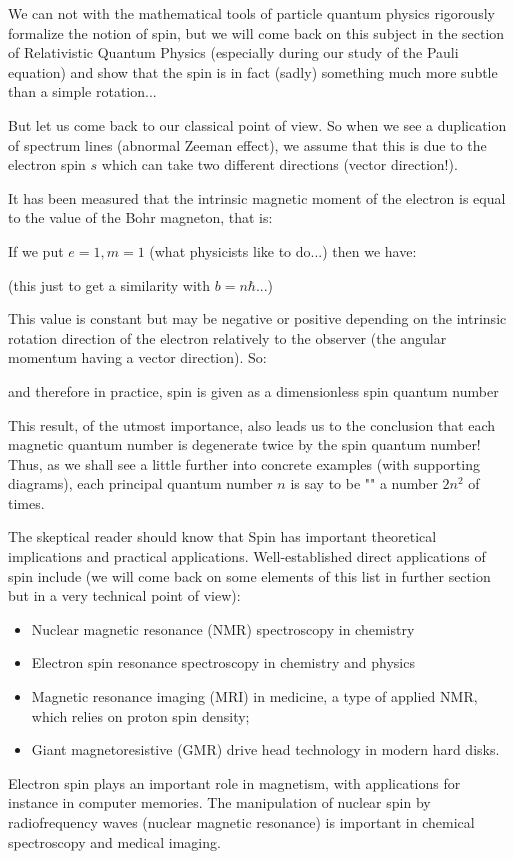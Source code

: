    We can not with the mathematical tools of particle quantum physics rigorously formalize the notion of spin, but we will come back on this subject in the section of  Relativistic Quantum Physics (especially during our study of the Pauli equation) and show that the spin is in fact (sadly) something much more subtle than a simple rotation...

    But let us come back to our classical point of view. So when we see a duplication of spectrum lines (abnormal Zeeman effect), we assume that this is due to the electron spin $s$ which can take two different directions (vector direction!).

    It has been measured that the intrinsic magnetic moment of the electron is equal to the value of the Bohr magneton, that is:
    
    If we put $e=1,m=1$ (what physicists like to do...) then we have:
         
    (this just to get a similarity with $b=n\hbar$...)

     This value is constant but may be negative or positive depending on the intrinsic rotation direction of the electron relatively to the observer (the angular momentum having a vector direction). So:
    
    and therefore in practice, spin is given as a dimensionless spin quantum number 
     
    This result, of the utmost importance, also leads us to the conclusion that each magnetic quantum number is degenerate twice by the spin quantum number! Thus, as we shall see a little further into concrete examples (with supporting diagrams), each principal quantum number $n$ is say to be "" a number $2n^2$ of times.
    
    The skeptical reader should know that Spin has important theoretical implications and practical applications. Well-established direct applications of spin include (we will come back on some elements of this list in further section but in a very technical point of view):
   \begin{itemize}
      \item Nuclear magnetic resonance (NMR) spectroscopy in chemistry
      \item Electron spin resonance spectroscopy in chemistry and physics
      \item Magnetic resonance imaging (MRI) in medicine, a type of applied NMR, which relies on proton spin density;
      \item Giant magnetoresistive (GMR) drive head technology in modern hard disks.
   \end{itemize}
    Electron spin plays an important role in magnetism, with applications for instance in computer memories. The manipulation of nuclear spin by radiofrequency waves (nuclear magnetic resonance) is important in chemical spectroscopy and medical imaging.
     
